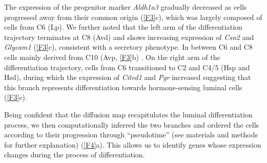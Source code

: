 \documentclass[titlepage, 12pt, oneside]{amsart}
\begin{document}
The expression of the progenitor marker \textit{Aldh1a3} gradually decreased as cells progressed away from their common origin (\autoref{F3}c), which was largely composed of cells from C6 (Lp).  
We further noted that the left arm of the differentiation trajectory terminates at C8 (Avd) and shows increasing expression of \textit{Csn2} and \textit{Glycam1} (\autoref{F3}c), consistent with a secretory phenotype.
In between C6 and C8  cells mainly derived from C10 (Avp, \autoref{F3}b) .
On the right arm of the differentiation trajectory, cells from C6 transitioned to C2 and C4/5 (Hsp and Hsd), during which the expression of \textit{Cited1} and \textit{Pgr} increased suggesting that this branch represents differentiation towards hormone-sensing luminal cells (\autoref{F3}c).

Being confident that the diffusion map recapitulates the luminal differentiation process, we then computationally inferred the two branches and ordered the cells according to their progression through ``pseudotime''\autocite{Haghverdi2016} (see materials and methods for further explanation) (\autoref{F4}a).
This allows us to identify genes whose expression changes during the process of differentiation.\\
\end{document}
